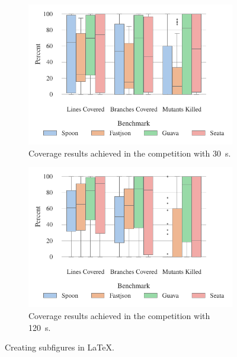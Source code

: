 \documentclass[sigconf,review,anonymous]{acmart}
\begin{document}

\begin{figure}
  \centering
  \begin{subfigure}{\columnwidth}
    \includegraphics[width=\linewidth]{data/CoverageByBenchmark30.pdf}
    \caption{Coverage results achieved in the competition with \SI{30}{\second}.}
    \label{fig:results30}
  \end{subfigure}
  \hfill
  \begin{subfigure}{\columnwidth}
    \includegraphics[width=\linewidth]{data/CoverageByBenchmark120.pdf}
    \caption{Coverage results achieved in the competition with \SI{120}{\second}.}
    \label{fig:results120}
  \end{subfigure}
  
  \caption{Creating subfigures in \LaTeX.}
  \label{fig:figures}
\end{figure}
\end{document}
